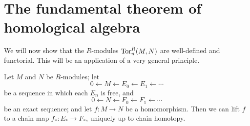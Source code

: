 \section{The fundamental theorem of homological algebra}

We will now show that the $R$-modules $\operatorname{Tor}^R_n(M,N)$ are well-defined 
and functorial. This will be an application of a very general principle.
\begin{theorem}
\label{thm-ftha}
Let $M$ and $N$ be $R$-modules; let
\[
0\leftarrow M\leftarrow E_0\leftarrow E_1\leftarrow\cdots
\]
be a sequence in which each $E_n$ is free, and 
\[
0\leftarrow N\leftarrow F_0\leftarrow F_1\leftarrow\cdots
\]
be an exact sequence; and let $f:M\to N$ be a homomorphism.
Then we can lift $f$ to a chain map $f_*:E_*\to F_*$, uniquely up to chain
homotopy.
\end{theorem}
